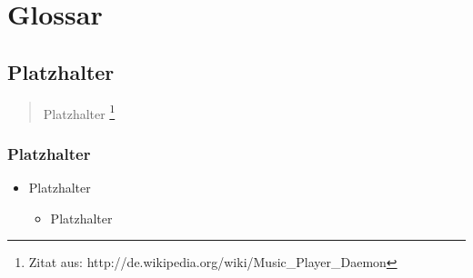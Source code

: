 \chapter{Glossar}

\section{Platzhalter}

\begin{quote}
Platzhalter
\footnote{Zitat aus: http://de.wikipedia.org/wiki/Music\_Player\_Daemon}
\end{quote}

\newpage
\subsection{Platzhalter}

\renewcommand{\labelitemi}{•}
\begin{itemize}
	\item Platzhalter
	
	\renewcommand{\labelitemi}{--}
	\begin{itemize}
		\item Platzhalter
	\end{itemize}
\end{itemize}
